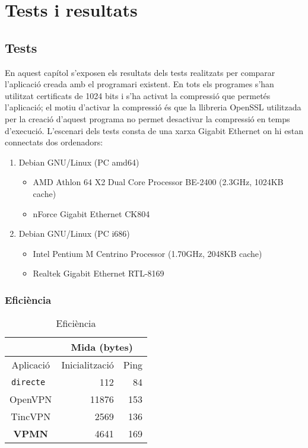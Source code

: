 \chapter{Tests i resultats}
\section{Tests}
En aquest capítol s'exposen els resultats dels tests realitzats per comparar l'aplicació creada amb el programari existent.
En tots els programes s'han utilitzat certificats de 1024 bits i s'ha activat la compressió que permetés l'aplicació; el motiu d'activar la compressió és que la llibreria OpenSSL utilitzada per la creació d'aquest programa no permet desactivar la compressió en temps d'execució.
L'escenari dels tests consta de una xarxa Gigabit Ethernet on hi estan connectats dos ordenadors:
\begin{enumerate}
\item Debian GNU/Linux (PC amd64)
\begin{itemize}
\item AMD Athlon 64 X2 Dual Core Processor BE-2400 (2.3GHz, 1024KB cache)
\item nForce Gigabit Ethernet CK804
\end{itemize}
\item Debian GNU/Linux (PC i686)
\begin{itemize}
\item Intel Pentium M Centrino Processor (1.70GHz, 2048KB cache)
\item Realtek Gigabit Ethernet RTL-8169
\end{itemize}
\end{enumerate}
\subsection{Eficiència}
\begin{table}[htb]
\begin{center}
\begin{tabular}{|c|r|r|}
\multicolumn{1}{c}{} & \multicolumn{2}{|c|}{Mida (bytes)} \\ \hline
Aplicació & Inicialització & Ping \\ \hline \hline
\tt directe & 112 & 84 \\ \hline
OpenVPN & 11876 & 153 \\ \hline
TincVPN & 2569 & 136 \\ \hline
\bf VPMN & 4641 & 169 \\ \hline
\end{tabular}
\end{center}
\begin{center}
\caption{Eficiència}
\label{T:efi}
\end{center}
\end{table}

